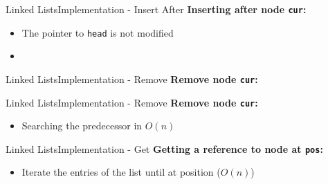 
\begin{frame}[fragile]{Linked Lists}{Implementation - Insert After}
  \textbf{Inserting after node \texttt{cur}:}
  \begin{itemize}
    \item<2->
      The pointer to \texttt{head} is not modified
    \item<3->
      
  \end{itemize}
\end{frame}


\begin{frame}{Linked Lists}{Implementation - Remove}
  \textbf{Remove node \texttt{cur}:}
  \begin{flushleft}
    
  \end{flushleft}
\end{frame}



\begin{frame}[fragile]{Linked Lists}{Implementation - Remove}
  \textbf{Remove node \texttt{cur}:}
  \begin{itemize}
    \item<2->
      Searching the predecessor in $O(n)$
      
  \end{itemize}
\end{frame}


\begin{frame}[fragile]{Linked Lists}{Implementation - Get}
  \textbf{Getting a reference to node at \texttt{pos}:}
  \begin{itemize}
    \item<3->
      Iterate the entries of the list until at position ($O(n)$)
      
  \end{itemize}
\end{frame}

